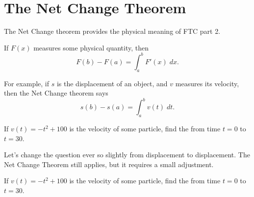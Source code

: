 \documentclass[../main.tex]{subfiles}
\begin{document}
 \section{The Net Change Theorem}
The Net Change theorem provides the physical meaning of FTC part 2.

\begin{mdframed}[style=withref-compact]
  If \(F(x)\) measures some physical quantity, then 
  \[
    F(b) - F(a) = \int_{a}^{b} F'(x) \;dx.
  \]

\end{mdframed}


For example, if \(s\) is the displacement of an object, and \(v\) measures its velocity, then the Net Change theorem says 
\[
  s(b) - s(a) = \int_{a}^{b} v(t) \;dt.
\]


\begin{example}
  If \(v(t) = -t^{2} + 100\) is the velocity of some particle, find the  from time \(t = 0\) to \(t = 30\).

\end{example}
\clearpage

Let's change the question ever so slightly from  displacement to  displacement. The Net Change Theorem still applies, but it requires a small adjustment.
\begin{example}
  If \(v(t) = -t^{2} + 100\) is the velocity of some particle, find the  from time \(t = 0\) to \(t = 30\).

\end{example}
\end{document}
